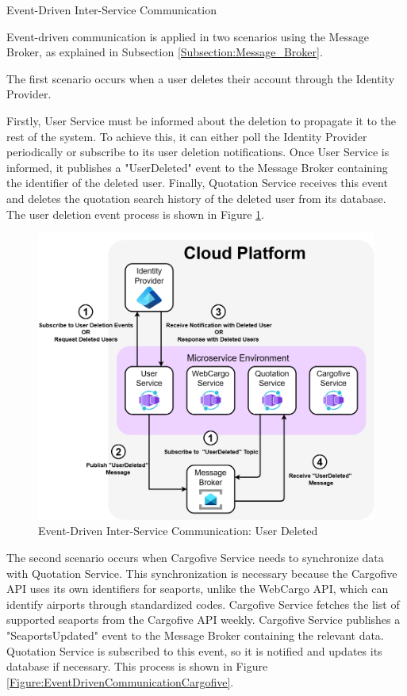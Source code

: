 \documentclass[12pt, reqno]{amsbook}
\makeatletter
\def\subsection{\@startsection{subsection}{2}%
      \z@{.5\linespacing\@plus.7\linespacing}{.25\linespacing}%
      {\normalfont\bfseries\flushleft}}
\theoremstyle{definition}
\theoremstyle{definition}
\numberwithin{section}{chapter}
\numberwithin{table}{chapter}
\numberwithin{figure}{chapter}
\makeatother
\begin{document}
\subsection{Event-Driven Inter-Service Communication}
\label{Subsection:Event_Driven_Inter_Service_Communication}

Event-driven communication is applied in two scenarios using the Message Broker, as explained in Subsection \ref{Subsection:Message_Broker}.

The first scenario occurs when a user deletes their account through the Identity Provider.

Firstly, User Service must be informed about the deletion to propagate it to the rest of the system. To achieve this, it can either poll the Identity Provider periodically or subscribe to its user deletion notifications. Once User Service is informed, it publishes a "UserDeleted" event to the Message Broker containing the identifier of the deleted user. Finally, Quotation Service receives this event and deletes the quotation search history of the deleted user from its database. The user deletion event process is shown in Figure \ref{Figure:EventDrivenCommunicationUserDeleted}.

\begin{figure}[H]
  \centering
  \includegraphics[width=0.9\linewidth]{images/EventDrivenCommunicationUserDeleted.png}
  \caption{\label{Figure:EventDrivenCommunicationUserDeleted}Event-Driven Inter-Service Communication: User Deleted}
\end{figure}

The second scenario occurs when Cargofive Service needs to synchronize data with Quotation Service. This synchronization is necessary because the Cargofive \Ac{API} uses its own identifiers for seaports, unlike the WebCargo \ac{API}, which can identify airports through standardized codes. Cargofive Service fetches the list of supported seaports from the Cargofive \ac{API} weekly. Cargofive Service publishes a "SeaportsUpdated" event to the Message Broker containing the relevant data. Quotation Service is subscribed to this event, so it is notified and updates its database if necessary. This process is shown in Figure \ref{Figure:EventDrivenCommunicationCargofive}.
\end{document}
